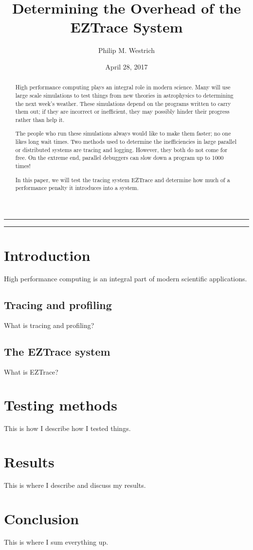 \documentclass[10pt]{article}
\title{Determining the Overhead of the EZTrace System}
\author{Philip M. Westrich}
\date{April 28, 2017}
\begin{document}
\maketitle
\vspace{-0.3in}\noindent\rule{\linewidth}{0.4pt}
\doublespacing

\begin{abstract}

    High performance computing plays an integral role in modern science. Many will use large scale simulations to test 
    things from new theories in astrophysics to determining the next week's weather. These simulations depend on the 
    programs written to carry them out; if they are incorrect or inefficient, they may possibly hinder their progress 
    rather than help it.
    
    The people who run these simulations always would like to make them faster; no one likes long wait times. Two methods 
    used to determine the inefficiencies in large parallel or distributed systems are tracing and logging. However, they 
    both do not come for free. On the extreme end, parallel debuggers can slow down a program up to 1000 times!
    
    In this paper, we will test the tracing system EZTrace and determine how much of a performance penalty it introduces 
    into a system.\\
 
\end{abstract}

\vspace{-0.3in}\noindent\rule{\linewidth}{0.4pt}

\section{Introduction}

High performance computing is an integral part of modern scientific applications.

\subsection{Tracing and profiling}

What is tracing and profiling?

\subsection{The EZTrace system}

What is EZTrace? \cite{Trahay2011}

\section{Testing methods}

This is how I describe how I tested things.

\section{Results}

This is where I describe and discuss my results.

\section{Conclusion}

This is where I sum everything up.



\end{document}
